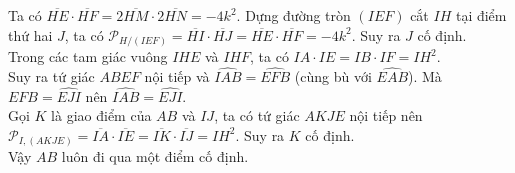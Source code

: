 \begin{bt}
{\begin{enumerate}
			Ta có $\overline{HE}\cdot \overline{HF}=2\overline{HM}\cdot 2\overline{HN}=-4k^2$. Dựng đường tròn $(IEF)$ cắt $IH$ tại điểm thứ hai $J$, ta có $\mathscr{P}_{H/(IEF)}=\overline{HI}\cdot\overline{HJ}=\overline{HE}\cdot \overline{HF}=-4k^2$. Suy ra $J$ cố định.\\
			Trong các tam giác vuông $IHE$ và $IHF$, ta có $IA\cdot IE=IB\cdot IF=IH^2$.\\
			Suy ra tứ giác $ABEF$ nội tiếp và $\widehat{IAB}=\widehat{EFB}$ (cùng bù với $\widehat{EAB}$). Mà $\widehat{EFB}=\widehat{EJI}$ nên $\widehat{IAB}=\widehat{EJI}$.\\
			Gọi $K$ là giao điểm của $AB$ và $IJ$, ta có tứ giác $AKJE$ nội tiếp nên $\mathscr{P}_{I,(AKJE)}=\overline{IA}\cdot \overline{IE}=\overline{IK}\cdot \overline{IJ}=IH^2$. Suy ra $K$ cố định.\\
			Vậy $AB$ luôn đi qua một điểm cố định.
		\end{enumerate}
	}
\end{bt}


